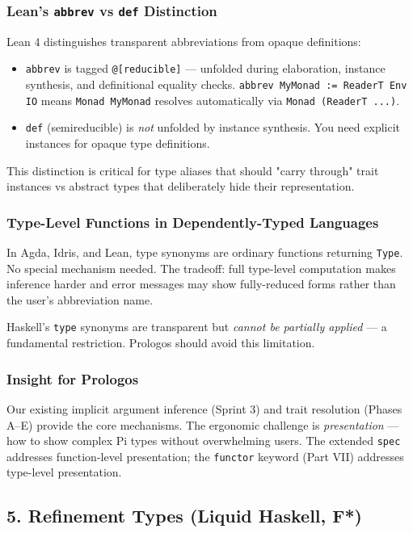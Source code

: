 \documentclass[11pt]{article}
\begin{document}
\subsubsection{Lean's \texttt{abbrev} vs \texttt{def} Distinction}
\label{sec:org8db01bb}

Lean 4 distinguishes transparent abbreviations from opaque definitions:

\begin{itemize}
\item \texttt{abbrev} is tagged \texttt{@[reducible]} --- unfolded during elaboration, instance
synthesis, and definitional equality checks. \texttt{abbrev MyMonad := ReaderT Env IO}
means \texttt{Monad MyMonad} resolves automatically via \texttt{Monad (ReaderT ...)}.
\item \texttt{def} (semireducible) is \emph{not} unfolded by instance synthesis. You need
explicit instances for opaque type definitions.
\end{itemize}

This distinction is critical for type aliases that should "carry through" trait
instances vs abstract types that deliberately hide their representation.
\subsubsection{Type-Level Functions in Dependently-Typed Languages}
\label{sec:orgad9ce56}

In Agda, Idris, and Lean, type synonyms are ordinary functions returning \texttt{Type}.
No special mechanism needed. The tradeoff: full type-level computation makes
inference harder and error messages may show fully-reduced forms rather than the
user's abbreviation name.

Haskell's \texttt{type} synonyms are transparent but \emph{cannot be partially applied} ---
a fundamental restriction. Prologos should avoid this limitation.
\subsubsection{Insight for Prologos}
\label{sec:orgd1994f9}

Our existing implicit argument inference (Sprint 3) and trait resolution (Phases
A--E) provide the core mechanisms. The ergonomic challenge is \emph{presentation} ---
how to show complex Pi types without overwhelming users. The extended \texttt{spec}
addresses function-level presentation; the \texttt{functor} keyword (Part VII)
addresses type-level presentation.
\subsection{5. Refinement Types (Liquid Haskell, F*)}
\label{sec:org3acded3}
\end{document}
